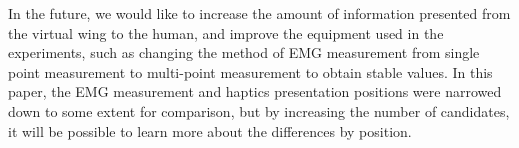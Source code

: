 \documentclass[letterpaper, 10 pt, conference]{ieeeconf}  %
\begin{document}
        In the future, we would like to increase the amount of information presented from the virtual wing to the human, and improve the equipment used in the experiments, such as changing the method of EMG measurement from single point measurement to multi-point measurement to obtain stable values. 
        In this paper, the EMG measurement and haptics presentation positions were narrowed down to some extent for comparison, but by increasing the number of candidates, it will be possible to learn more about the differences by position.






\end{document}
